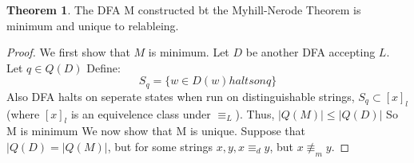 \documentclass{article}
\theoremstyle{definition}
\newtheorem{theorem}{Theorem}[section]
\begin{document}
\begin{theorem}
The DFA M constructed bt the Myhill-Nerode Theorem is minimum and unique to relableing.
\end{theorem}
\begin{proof}
We first show that $M$ is minimum. Let $D$ be another DFA accepting $L$. Let $q \in Q(D)$ Define: $$S_q = \{w\in D(w) halts on q\}$$ Also DFA halts on seperate states when run on distinguishable strings, $S_q \subset[x]_l$ (where $[x]_l$ is an equivelence class under $\equiv_L$). Thus, $|Q(M)| \leq |Q(D)|$ So M is minimum We now show that M is unique. Suppose that $|Q(D) = |Q(M)|$, but for some strings $x,y, x \equiv_dy$, but $x \not \equiv_my$.
\end{proof}
\end{document}
